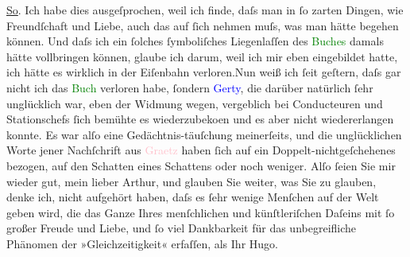            \pstart
           \uline{So}. Ich habe dies ausgeſprochen, weil ich finde, daſs
               man in ſo zarten Dingen, wie Freundſchaft und Liebe, auch das auf ſich nehmen muſs,
               was man hätte begehen können. Und {\pb}daſs ich ein ſolches ſymboliſches Liegenlaſſen des \textcolor{green}{Buches}{} damals hätte vollbringen können, glaube
               ich darum, weil ich mir eben eingebildet hatte, ich hätte es wirklich in der
               Eiſenbahn verloren.\hspace*{1.5em}Nun weiß ich ſeit geſtern, daſs
               gar nicht ich das \textcolor{green}{Buch}{} verloren
                  habe,{ }{\pb}ſondern \textcolor{blue}{Gerty}{}\ledrightnote{\textcolor{blue}{Gertrude von Hofmannsthal}}, die darüber natürlich ſehr unglücklich war, eben der
               Widmung wegen, vergeblich bei Conducteuren und Stationschefs ſich bemühte es
                  wiederzubeko{\geminationm}en und es aber nicht wiedererlangen
               konnte.\pend
           \pstart
           Es war alſo eine Gedächtnis-täuſchung {\pb}meinerſeits, und die unglücklichen
               Worte jener Nachſchrift aus \textcolor{pink}{Graetz}{}\ledrightnote{\textcolor{pink}{Graz}} haben ſich auf
               ein Doppelt-nichtgeſchehenes bezogen, auf den Schatten eines Schattens oder noch
               weniger.\pend
           \pstart
           Alſo ſeien Sie mir wieder gut, mein lieber Arthur, und glauben Sie weiter, was Sie
                  {\pb}zu glauben, denke ich, nicht
               aufgehört haben, daſs es ſehr wenige Menſchen auf der Welt geben wird, die das Ganze
               Ihres menſchlichen und künſtleriſchen Daſeins mit ſo großer Freude und Liebe, und ſo
               viel Dankbarkeit für das unbegreifliche Phänomen der »Gleichzeitigkeit« erfaſſen, als
               Ihr\pend
           \pstart \spacefill\mbox{Hugo.}\pend{}\endnumbering{}  
      